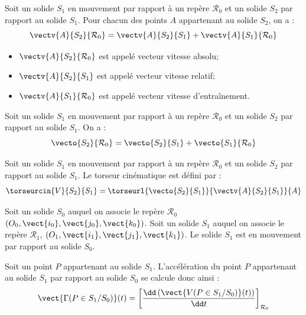 \begin{resultat}
\label{ref_va}

Soit un solide $S_1$ en mouvement par rapport à un repère $\mathcal{R}_0$ et un solide $S_2$ par rapport au solide $S_1$. Pour chacun des points $A$ appartenant au solide $S_2$, on a :
$$
\vectv{A}{S_2}{\mathcal{R}_0}=
\vectv{A}{S_2}{S_1}+\vectv{A}{S_1}{\mathcal{R}_0}
$$
\end{resultat}


\begin{remarque}
\begin{itemize}
\item $\vectv{A}{S_2}{\mathcal{R}_0}$ est appelé vecteur vitesse absolu;
\item $\vectv{A}{S_2}{S_1}$ est appelé vecteur vitesse relatif; 
\item $\vectv{A}{S_1}{\mathcal{R}_0}$ est appelé vecteur vitesse d'entraînement.
\end{itemize}
\end{remarque}

\begin{resultat}

Soit un solide $S_1$ en mouvement par rapport à un repère $\mathcal{R}_0$ et un solide $S_2$ par rapport au solide $S_1$. On a : 
$$
\vecto{S_2}{\mathcal{R}_0}=
\vecto{S_2}{S_1}+\vecto{S_1}{\mathcal{R}_0}
$$
\end{resultat}


\begin{defi}

Soit un solide $S_1$ en mouvement par rapport à un repère $\mathcal{R}_0$ et un solide $S_2$ par rapport au solide $S_1$. Le torseur cinématique est défini par :
$$
\torseurcin{V}{S_2}{S_1}
= \torseurl{\vecto{S_2}{S_1}}{\vectv{A}{S_2}{S_1}}{A}
$$
\end{defi}

\begin{defi}

Soit un solide $S_0$ auquel on associe le repère $\mathcal{R}_0$ $\left(O_0,\vect{i_0},\vect{j_0},\vect{k_0} \right)$.  Soit un solide $S_1$ auquel on associe le repère $\mathcal{R}_1$,  $\left(O_1,\vect{i_1},\vect{j_1},\vect{k_1} \right)$. Le solide $S_1$ est en mouvement par rapport au solide $S_0$. 


Soit un point $P$ appartenant au solide $S_1$. L'accélération du point $P$ appartenant au solide $S_1$ par rapport au solide $S_0$ se calcule donc ainsi : 
$$
\vect{\Gamma(P\in S_1/S_0)}(t) = \left[\dfrac{\dd \left( \vect{V(P\in S_1/S_0)}(t)\right)}{\dd t}\right]_{\mathcal{R}_0}
$$

\end{defi}

